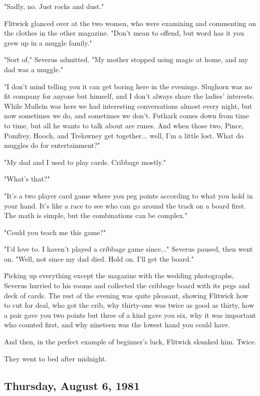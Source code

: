 "Sadly, no. Just rocks and dust."

Flitwick glanced over at the two women, who were examining and commenting on the clothes in the other magazine. "Don't mean to offend, but word has it you grew up in a muggle family."

"Sort of," Severus admitted. "My mother stopped using magic at home, and my dad was a muggle."

"I don't mind telling you it can get boring here in the evenings. Slughorn was no fit company for anyone but himself, and I don't always share the ladies' interests. While Mullein was here we had interesting conversations almost every night, but now sometimes we do, and sometimes we don't. Futhark comes down from time to time, but all he wants to talk about are runes. And when those two, Pince, Pomfrey, Hooch, and Trelawney get together... well, I'm a little lost. What do muggles do for entertainment?"

"My dad and I used to play cards. Cribbage mostly."

"What's that?"

"It's a two player card game where you peg points according to what you hold in your hand. It's like a race to see who can go around the track on a board first. The math is simple, but the combinations can be complex."

"Could you teach me this game?"

"I'd love to. I haven't played a cribbage game since..." Severus paused, then went on. "Well, not since my dad died. Hold on. I'll get the board."

Picking up everything except the magazine with the wedding photographs, Severus hurried to his rooms and collected the cribbage board with its pegs and deck of cards. The rest of the evening was quite pleasant, showing Flitwick how to cut for deal, who got the crib, why thirty-one was twice as good as thirty, how a pair gave you two points but three of a kind gave you six, why it was important who counted first, and why nineteen was the lowest hand you could have.

And then, in the perfect example of beginner's luck, Flitwick skunked him. Twice.

They went to bed after midnight.

\subsection{Thursday, August 6, 1981}

